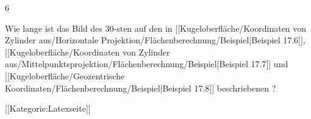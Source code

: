 {6}
{

Wie lange ist das Bild des $30$-sten
auf den in
[[Kugeloberfläche/Koordinaten von Zylinder aus/Horizontale Projektion/Flächenberechnung/Beispiel|Beispiel 17.6]],
[[Kugeloberfläche/Koordinaten von Zylinder aus/Mittelpunktsprojektion/Flächenberechnung/Beispiel|Beispiel 17.7]]
und
[[Kugeloberfläche/Geozentrische Koordinaten/Flächenberechnung/Beispiel|Beispiel 17.8]]
beschriebenen
 {} {?}

}
{} {}

 [[Kategorie:Latexseite]]
